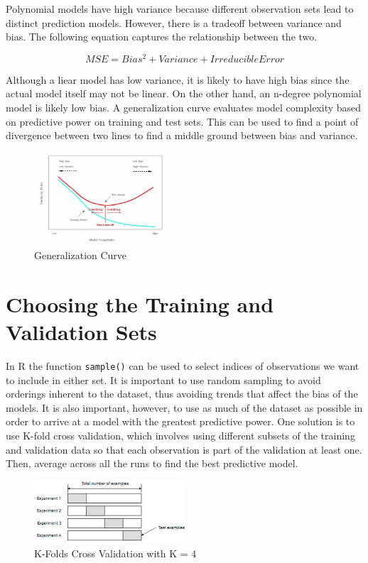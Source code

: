 Polynomial models have high variance because different observation sets lead to distinct prediction models. However, there is a tradeoff between variance and bias. The following equation captures the relationship between the two. 

$$MSE = Bias^2 + Variance + Irreducible Error$$

Although a liear model has low variance, it is likely to have high bias since the actual model itself may not be linear. On the other hand, an n-degree polynomial model is likely low bias. A generalization curve evaluates model complexity based on predictive power on training and test sets. This can be used to find a point of divergence between two lines to find a middle ground between bias and variance. 

\begin{figure}[h]
\begin{center}
\includegraphics[width=0.45\textwidth]{figures/figure2.jpg}
\caption{Generalization Curve}
\end{center}
\end{figure}

\newpage

\section{Choosing the Training and Validation Sets}

In R the function \texttt{sample()} can be used to select indices of observations we want to include in either set. It is important to use random sampling to avoid orderings inherent to the dataset, thus avoiding trends that affect the bias of the models. It is also important, however, to use as much of the dataset as possible in order to arrive at a model with the greatest predictive power. One solution is to use K-fold cross validation, which involves using different subsets of the training and validation data so that each observation is part of the validation at least one. Then, average across all the runs to find the best predictive model. 

\begin{figure}[h]
\begin{center}
\includegraphics[width=0.5\textwidth]{figures/figure3.jpg}
\caption{K-Folds Cross Validation with K = 4}
\end{center}
\end{figure}

